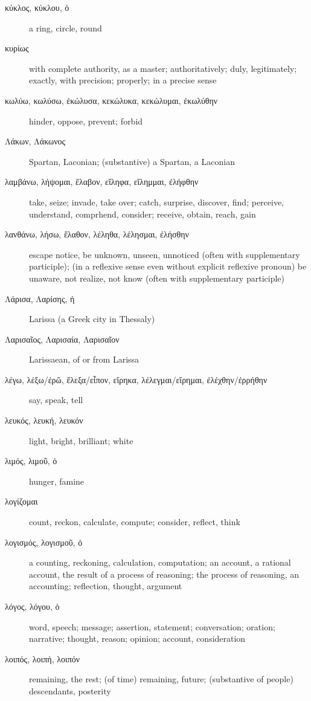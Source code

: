\documentclass[12pt,letterpaper]{article}
\begin{document}
\begin{description}
    \item[\textgreek{κύκλος, κύκλου, ὁ}] \marginnote{*}a ring, circle, round
    \item[\textgreek{κυρίως}] \marginnote{*}with complete authority, as a master; authoritatively; duly, legitimately; exactly, with precision; properly; in a precise sense
    \item[\textgreek{κωλύω, κωλύσω, ἐκώλυσα, κεκώλυκα, κεκώλυμαι, ἐκωλύθην}] \marginnote{*}hinder, oppose, prevent; forbid
    \item[\textgreek{Λάκων, Λάκωνος}] Spartan, Laconian; (substantive) a Spartan, a Laconian
    \item[\textgreek{λαμβάνω, λήψομαι, ἔλαβον, εἴληφα, εἴλημμαι, ἐλήφθην}] \marginnote{*}take, seize; invade, take over; catch, surprise, discover, find; perceive, understand, comprhend, consider; receive, obtain, reach, gain
    \item[\textgreek{λανθάνω, λήσω, ἔλαθον, λέληθα, λέλησμαι, ἐλήσθην}] \marginnote{*}escape notice, be unknown, unseen, unnoticed (often with supplementary participle); (in a reflexive sense even without explicit reflexive pronoun) be unaware, not realize, not know (often with supplementary participle)
    \item[\textgreek{Λάρισα, Λαρίσης, ἡ}] Larissa (a Greek city in Thessaly)
    \item[\textgreek{Λαρισαῖος, Λαρισαία, Λαρισαῖον}] Larissaean, of or from Larissa
    \item[\textgreek{λέγω, λέξω/ἐρῶ, ἔλεξα/εἶπον, εἴρηκα, λέλεγμαι/εἴρημαι, ἐλέχθην/ἐρρήθην}] \marginnote{*}say, speak, tell
    \item[\textgreek{λευκός, λευκή, λευκόν}] light, bright, brilliant; white
    \item[\textgreek{λιμός, λιμοῦ, ὁ}] hunger, famine
    \item[\textgreek{λογίζομαι}] count, reckon, calculate, compute; consider, reflect, think
    \item[\textgreek{λογισμός, λογισμοῦ, ὁ}] a counting, reckoning, calculation, computation; an account, a rational account, the result of a process of reasoning; the process of reasoning, an accounting; reflection, thought, argument
    \item[\textgreek{λόγος, λόγου, ὁ}] \marginnote{*}word, speech; message; assertion, statement; conversation; oration; narrative; thought, reason; opinion; account, consideration
    \item[\textgreek{λοιπός, λοιπή, λοιπόν}] \marginnote{*}remaining, the rest; (of time) remaining, future; (substantive of people) descendants, posterity

\end{description}
\end{document}

